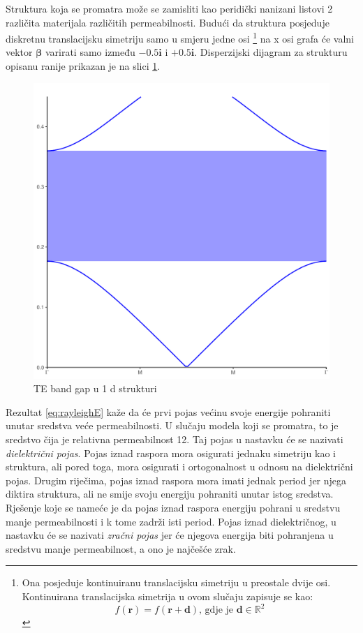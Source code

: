\documentclass[utf8, seminar]{fer}
\begin{document}
Struktura koja se promatra može se zamisliti kao peridički nanizani listovi 2
različita materijala različitih permeabilnosti. Budući da struktura posjeduje
diskretnu translacijsku simetriju samo u smjeru jedne osi
\footnote{
	Ona posjeduje kontinuiranu translacijsku simetriju u preostale dvije osi.
	Kontinuirana translacijska simetrija u ovom slučaju zapisuje se kao:
	$$f(\mathbf{r}) = f(\mathbf{r} + \mathbf{d})
	\text{, gdje je }{\mathbf{d} \in \mathbb{R}^2}$$
}
na x osi grafa će valni vektor $\mathbf{\beta}$ varirati samo između
$-0.5\mathbf{i}$ i $+0.5\mathbf{i}$. Disperzijski dijagram za strukturu opisanu
ranije prikazan je na slici \ref{fig:1d_band_diagram}.
\begin{figure}[ht]
	\centering
	\includegraphics[width = 1.0\linewidth]{./images/1d_crystal_gap.pdf}
	\caption{TE band gap u 1 d strukturi}
	\label{fig:1d_band_diagram}
\end{figure}

Rezultat \ref{eq:rayleighE} kaže da će prvi pojas većinu svoje energije
pohraniti unutar sredstva veće permeabilnosti. U slučaju modela koji se
promatra, to je sredstvo čija je relativna permeabilnost 12. Taj pojas
u nastavku će se nazivati \emph{dielektrični pojas}. Pojas iznad raspora mora
osigurati jednaku simetriju kao i struktura, ali pored toga, mora osigurati i
ortogonalnost u odnosu na dielektrični pojas. Drugim riječima, pojas iznad
raspora mora imati jednak period jer njega diktira struktura, ali ne smije svoju
energiju pohraniti unutar istog sredstva. Rješenje koje se nameće je da pojas
iznad raspora energiju pohrani u sredstvu manje permeabilnosti i k tome zadrži
isti period. Pojas iznad dielektričnog, u nastavku će se nazivati \emph{zračni
pojas} jer će njegova energija biti pohranjena u sredstvu manje permeabilnost,
a ono je najčešće zrak.
\end{document}
